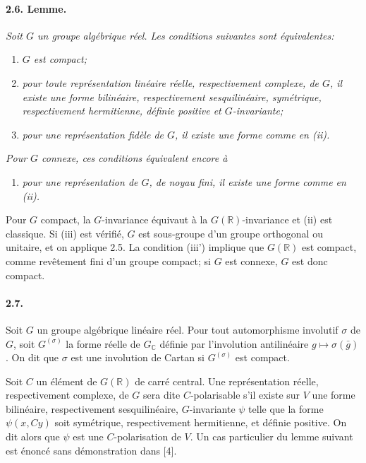 \documentclass[10pt]{article}
\newcommand{\C}{\mathbb{C}}
\newcommand{\R}{\mathbb{R}}
\begin{document}
\paragraph{2.6. Lemme.} \emph{Soit $G$ un groupe algébrique réel. Les conditions suivantes sont équivalentes:}
\begin{enumerate}[label=(\roman*)]
\item \emph{$G$ est compact;}
\item \emph{pour toute représentation linéaire réelle, respectivement complexe, de $G$, il existe une forme bilinéaire, respectivement sesquilinéaire, symétrique, respectivement hermitienne, définie positive et $G$-invariante;}
\item \emph{pour une représentation fidèle de $G$, il existe une forme comme en (ii).}
\end{enumerate}
\emph{Pour $G$ connexe, ces conditions équivalent encore à}
\begin{enumerate}[label=(iii\textquotesingle)]
\item \emph{pour une représentation de $G$, de noyau fini, il existe une forme comme en (ii).}
\end{enumerate}

Pour $G$ compact, la $G$-invariance équivaut à la $G(\R)$-invariance et (ii) est classique. Si (iii) est vérifié, $G$ est sous-groupe d'un groupe orthogonal ou unitaire, et on applique 2.5. La condition (iii') implique que $G(\R)$ est compact, comme revêtement fini d'un groupe compact; si $G$ est connexe, $G$ est donc compact.

\paragraph{2.7.} Soit $G$ un groupe algébrique linéaire réel. Pour tout automorphisme involutif $\sigma$ de $G$, soit $G^{(\sigma)}$ la forme réelle de $G_\C$ définie par l'involution antilinéaire $g\mapsto\sigma(\bar g)$. On dit que $\sigma$ est une involution de Cartan si $G^{(\sigma)}$ est compact.

Soit $C$ un élément de $G(\R)$ de carré central. Une représentation réelle, respectivement complexe, de $G$ sera dite $C$-polarisable s'il existe sur $V$ une forme bilinéaire, respectivement sesquilinéaire, $G$-invariante $\psi$ telle que la forme $\psi(x,Cy)$ soit symétrique, respectivement hermitienne, et définie positive. On dit alors que $\psi$ est une $C$-polarisation de $V$. Un cas particulier du lemme suivant est énoncé sans démonstration dans [4].
\end{document}
